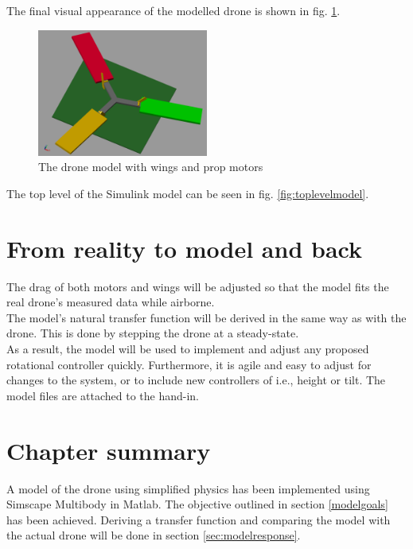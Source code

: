 The final visual appearance of the modelled drone is shown in fig. \ref{fig:fullmodeldrone}.
\begin{figure}[h!]
    \centering
    \includegraphics[width=0.5\textwidth]{figures/system_modelling/drone_full_physical_appearance.PNG}
    \caption{The drone model with wings and prop motors}
    \label{fig:fullmodeldrone}
\end{figure}

The top level of the Simulink model can be seen in fig. \ref{fig:toplevelmodel}.

\section{From reality to model and back}
The drag of both motors and wings will be adjusted so that the model fits the real drone's measured data while airborne. \\
The model's natural transfer function will be derived in the same way as with the drone. This is done by stepping the drone at a steady-state. \\

As a result, the model will be used to implement and adjust any proposed rotational controller quickly. Furthermore, it is agile and easy to adjust for changes to the system, or to include new controllers of i.e., height or tilt. The model files are attached to the hand-in.

\section{Chapter summary}
A model of the drone using simplified physics has been implemented using Simscape Multibody in Matlab. The objective outlined in section \ref{modelgoals} has been achieved. Deriving a transfer function and comparing the model with the actual drone will be done in section \ref{sec:modelresponse}. 